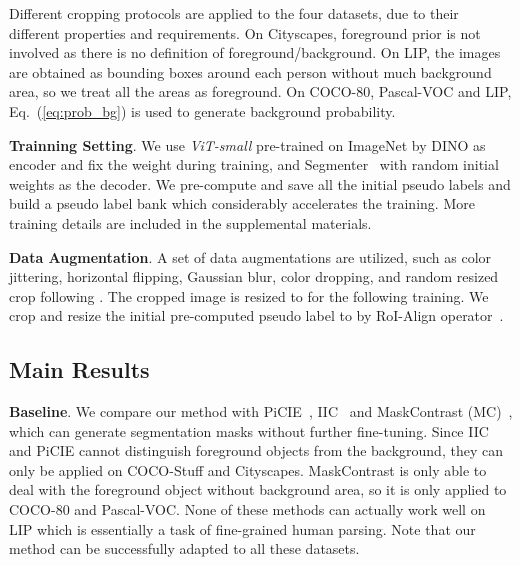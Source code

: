 \documentclass[runningheads]{llncs}
\newcommand{\PAR}[1]{\smallskip \noindent \textbf{#1}}
\renewcommand{\eqref}[1]{Eq.~(\ref{#1})}
\begin{document}
Different cropping protocols are applied to the four datasets, due to their different properties and requirements. On Cityscapes, foreground prior is not involved as there is no definition of foreground/background. On LIP, the images are obtained as bounding boxes around each person without much background area, so we treat all the areas as foreground. On COCO-80, Pascal-VOC and LIP, \eqref{eq:prob_bg} is used to generate background probability. 


\PAR{Trainning Setting}. We use \textit{ViT-small}  pre-trained on ImageNet by DINO\cite{DINO} as encoder and fix the weight during training, and Segmenter~\cite{strudel2021segmenter} with random initial weights as the decoder. We pre-compute and save all the initial pseudo labels and build a pseudo label bank which considerably accelerates the training. More training details are included in the supplemental materials.


\PAR{Data Augmentation}. A set of data augmentations are utilized, such as color jittering, horizontal flipping, Gaussian blur, color dropping, and random resized crop following \cite{BYOL,DINO}. The cropped image is resized to  for the following training. We crop and resize the initial pre-computed pseudo label to  by RoI-Align operator~\cite{he2017maskrcnn}.



\subsection{Main Results}
\PAR{Baseline}. We compare our method with PiCIE~\cite{PiCIE}, IIC~\cite{IIC} and MaskContrast (MC)~\cite{MaskContrast}, which can generate segmentation masks without further fine-tuning. Since IIC and PiCIE cannot distinguish foreground objects from the background, they can only be applied on COCO-Stuff and Cityscapes. MaskContrast is only able to deal with the foreground object without background area, so it is only applied to COCO-80 and Pascal-VOC. None of these methods can actually work well on LIP which is essentially a task of fine-grained human parsing. Note that our method can be successfully adapted to all these datasets.
\end{document}
